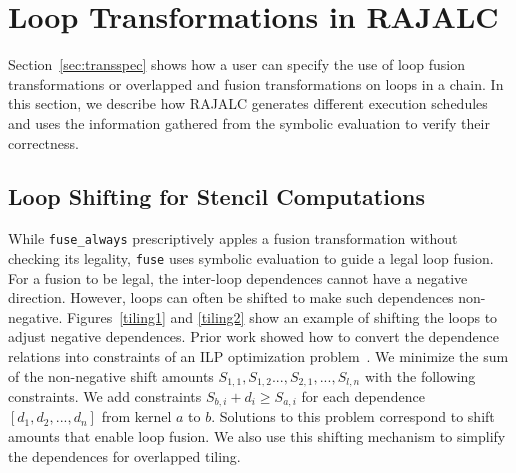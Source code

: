\section{Loop Transformations in RAJALC}


Section~\ref{sec:transspec} shows how a user can specify the use of loop fusion transformations
or overlapped and fusion transformations on loops in a chain.
In this section, we describe 
how RAJALC generates different execution schedules and uses the information gathered from the symbolic evaluation to verify their correctness.

\subsection{Loop Shifting for Stencil Computations}

While \verb.fuse_always. prescriptively apples a fusion transformation
without checking its legality, \verb.fuse. uses symbolic evaluation to
guide a legal loop fusion.
For a fusion to be legal, the inter-loop dependences cannot have a
negative direction.
However, loops can often be shifted to make such
dependences non-negative.
Figures~\ref{tiling1} and \ref{tiling2} show an example of shifting the
loops to adjust negative dependences.
Prior work showed how to convert the dependence relations into constraints
of an ILP optimization problem~\cite{Bertolacci2019}.
We minimize the sum of the non-negative shift amounts
$S_{1,1},S_{1,2}...,S_{2,1},...,S_{l,n}$ with the following constraints. 
We add constraints $S_{b,i} + d_i \geq S_{a,i}$ for each dependence
$[d_1,d_2,...,d_n]$ from kernel $a$ to $b$.
Solutions to this problem correspond to shift amounts that enable loop fusion.
We also use this shifting mechanism to simplify the dependences for overlapped
tiling.

